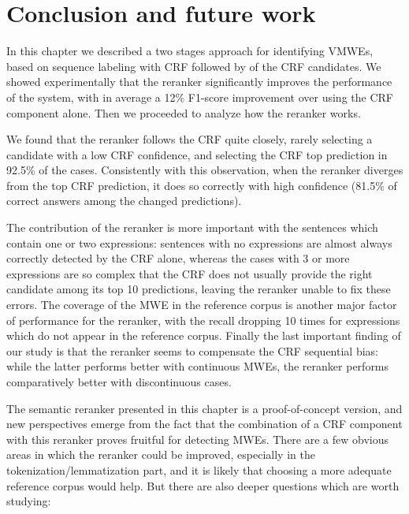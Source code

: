 \documentclass[output=paper,modfonts,nonflat]{langsci/langscibook}
\begin{document}
\section{\label{moreau:sec:conc2}Conclusion and future work}


In this chapter we described a two stages approach for identifying
VMWEs, based on sequence labeling with CRF followed by  of
the CRF candidates. We showed experimentally that the reranker
significantly improves the performance of the system, with in average
a 12\% F1-score improvement over using the CRF component alone. Then
we proceeded to analyze how the reranker works.

We found that the reranker follows the CRF quite closely, rarely
selecting a candidate with a low CRF confidence, and selecting the CRF
top prediction in 92.5\% of the cases. Consistently with this
observation, when the reranker diverges from the top CRF prediction,
it does so correctly with high confidence (81.5\% of correct answers
among the changed predictions).

The contribution of the reranker is more important with the sentences
which contain one or two expressions: sentences with no expressions
are almost always correctly detected by the CRF alone, whereas the
cases with 3 or more expressions are so complex that the CRF does not
usually provide the right candidate among its top 10 predictions,
leaving the reranker unable to fix these errors. The coverage of the
MWE in the reference corpus is another major factor of performance for
the reranker, with the recall dropping 10 times for expressions which
do not appear in the reference corpus. Finally the last important
finding of our study is that the reranker seems to compensate the CRF
sequential bias: while the latter performs better with continuous
MWEs, the reranker performs comparatively better with discontinuous
cases.

The semantic reranker presented in this chapter is a proof-of-concept
version, and new perspectives emerge from the fact that the
combination of a CRF component with this reranker proves fruitful for
detecting MWEs. There are a few obvious areas in which the reranker
could be improved, especially in the tokenization/lemmatization part,
and it is likely that choosing a more adequate reference corpus would
help. But there are also deeper questions which are worth studying:
\end{document}
